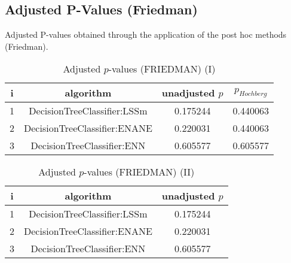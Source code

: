 \documentclass[a4paper,10pt]{article}
\begin{document}
\begin{landscape}
\section{Adjusted P-Values (Friedman)}


Adjusted P-values obtained through the application of the post hoc methods (Friedman).

\begin{table}[!htp]
\centering\small
\begin{tabular}{cccc}
i&algorithm&unadjusted $p$&$p_{Hochberg}$\\
\hline1&DecisionTreeClassifier:LSSm&0.175244&0.440063\\2&DecisionTreeClassifier:ENANE&0.220031&0.440063\\3&DecisionTreeClassifier:ENN&0.605577&0.605577\\\hline
\end{tabular}
\caption{Adjusted $p$-values (FRIEDMAN) (I)}
\end{table}
\begin{table}[!htp]
\centering\small
\begin{tabular}{ccc}
i&algorithm&unadjusted $p$\\
\hline1&DecisionTreeClassifier:LSSm&0.175244\\2&DecisionTreeClassifier:ENANE&0.220031\\3&DecisionTreeClassifier:ENN&0.605577\\\hline
\end{tabular}
\caption{Adjusted $p$-values (FRIEDMAN) (II)}
\end{table}

\newpage
\end{landscape}
\end{document}
